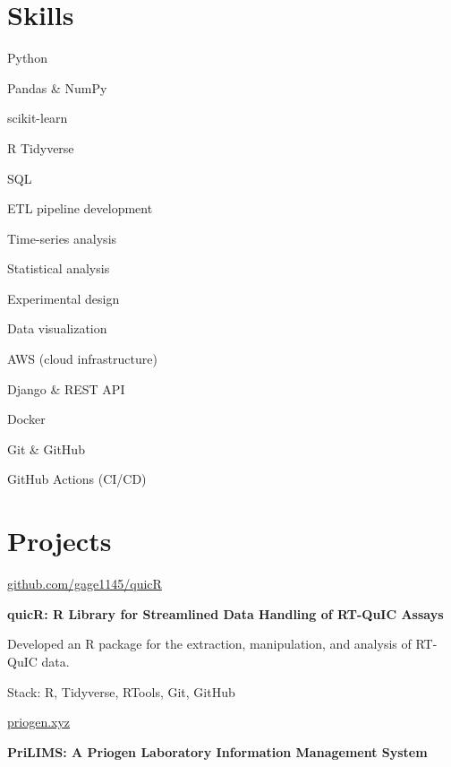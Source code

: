 \documentclass{resume}
\begin{document}
\section{Skills}\label{skills}

\begin{skills}
    \item Python
    \item Pandas \& NumPy
    \item scikit-learn
    \item R Tidyverse
    \item SQL
    \item ETL pipeline development
    \item Time-series analysis
    \item Statistical analysis
    \item Experimental design
    \item Data visualization
    \item AWS (cloud infrastructure)
    \item Django \& REST API
    \item Docker
    \item Git \& GitHub
    \item GitHub Actions (CI/CD)
\end{skills}

\section{Projects}\label{projects}

\begin{software}{\href{https://github.com/gage1145/quicR}{github.com/gage1145/quicR}}

\textbf{quicR: R Library for Streamlined Data Handling of RT-QuIC
Assays}

\end{software}

\begin{highlights}
    \item Developed an R package for the extraction, manipulation, and analysis of
RT-QuIC data.
    \item Stack: R, Tidyverse, RTools, Git, GitHub
\end{highlights}

\begin{software}{\href{https://priogen.xyz}{priogen.xyz}}

\textbf{PriLIMS: A Priogen Laboratory Information Management System}

\end{software}
\end{document}
